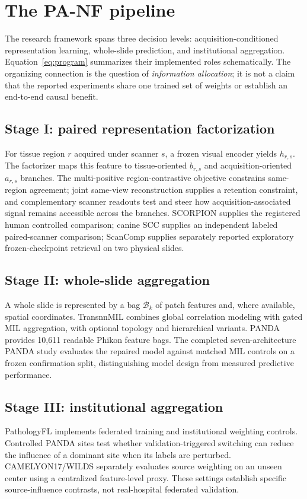 \section{The PA-NF pipeline}

The research framework spans three decision levels: acquisition-conditioned representation learning, whole-slide prediction, and institutional aggregation. Equation~\ref{eq:program} summarizes their implemented roles schematically. The organizing connection is the question of \emph{information allocation}; it is not a claim that the reported experiments share one trained set of weights or establish an end-to-end causal benefit.



\subsection{Stage I: paired representation factorization}
For tissue region $r$ acquired under scanner $s$, a frozen visual encoder yields $h_{r,s}$. The factorizer maps this feature to tissue-oriented $b_{r,s}$ and acquisition-oriented $a_{r,s}$ branches. The multi-positive region-contrastive objective constrains same-region agreement; joint same-view reconstruction supplies a retention constraint, and complementary scanner readouts test and steer how acquisition-associated signal remains accessible across the branches. SCORPION supplies the registered human controlled comparison; canine SCC supplies an independent labeled paired-scanner comparison; ScanComp supplies separately reported exploratory frozen-checkpoint retrieval on two physical slides.

\subsection{Stage II: whole-slide aggregation}
A whole slide is represented by a bag $\mathcal{B}_k$ of patch features and, where available, spatial coordinates. TransnnMIL combines global correlation modeling with gated MIL aggregation, with optional topology and hierarchical variants. PANDA provides 10,611 readable Phikon feature bags. The completed seven-architecture PANDA study evaluates the repaired model against matched MIL controls on a frozen confirmation split, distinguishing model design from measured predictive performance.

\subsection{Stage III: institutional aggregation}
PathologyFL implements federated training and institutional weighting controls. Controlled PANDA sites test whether validation-triggered switching can reduce the influence of a dominant site when its labels are perturbed. CAMELYON17/WILDS separately evaluates source weighting on an unseen center using a centralized feature-level proxy. These settings establish specific source-influence contrasts, not real-hospital federated validation.

